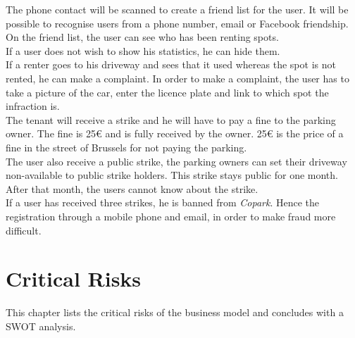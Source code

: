 \documentclass[12pt,a4paper,oneside]{book}
\newcommand{\bp}{\textit{Copark}}
\begin{document}
The phone contact will be scanned to create a friend list for the user. It will be possible to recognise users from a phone number, email or Facebook friendship. On the friend list, the user can see who has been renting spots.\\

If a user does not wish to show his statistics, he can hide them.\\

If a renter goes to his driveway and sees that it used whereas the spot is not rented, he can make a complaint. In order to make a complaint, the user has to take a picture of the car, enter the licence plate and link to which spot the infraction is.\\

The tenant will receive a strike and he will have to pay a fine to the parking owner. The fine is 25\euro{} and is fully received by the owner. 25\euro{} is the price of a fine in the street of Brussels for not paying the parking.\\

The user also receive a public strike, the parking owners can set their driveway non-available to public strike holders. This strike stays public for one month. After that month, the users cannot know about the strike.\\

If a user has received three strikes, he is banned from \bp{}. Hence the registration through a mobile phone and email, in order to make fraud more difficult.

\chapter{Critical Risks}
\label{crch}

This chapter lists the critical risks of the business model and concludes with a SWOT analysis.\\
\end{document}
